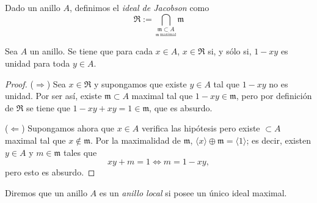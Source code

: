 \documentclass[./main.tex]{subfiles}
\begin{document}
	\begin{definition}
		Dado un anillo $A$, definimos el \textit{ideal de Jacobson} como $$\mathfrak R:=\bigcap_{\underset{\mathfrak m\ \text{maximal}}{\mathfrak m\subset A}}\mathfrak m$$
	\end{definition}
	
	\begin{proposition}
		Sea $A$ un anillo. Se tiene que para cada $x\in A$, $x\in\mathfrak R$ si, y sólo si, $1-xy$ es unidad para toda $y\in A$.
	\end{proposition}
	\begin{proof}
		($\Rightarrow$) Sea $x\in\mathfrak{R}$ y supongamos que existe $y\in A$ tal que $1-xy$ no es unidad. Por ser así, existe $\mathfrak m\subset A$ maximal tal que $1-xy\in\mathfrak m$, pero por definición de $\mathfrak R$ se tiene que $1-xy+xy=1\in\mathfrak m$, que es absurdo.
		
		($\Leftarrow$) Supongamos ahora que $x\in A$ verifica las hipótesis pero existe $\mathfrak\subset A$ maximal tal que $x\notin\mathfrak m$. Por la maximalidad de $\mathfrak m$, $\langle x\rangle\oplus \mathfrak m=\langle 1\rangle$; es decir, existen $y\in A$ y $m\in\mathfrak m$ tales que
		$$xy +m=1\Longleftrightarrow m=1-xy,$$
		pero esto es absurdo.
	\end{proof}
	
	\begin{definition}
		Diremos que un anillo $A$ es un \textit{anillo local} si posee un único ideal maximal.
	\end{definition}
	
\end{document}
